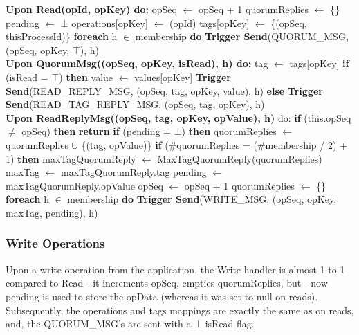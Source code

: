 \documentclass[sigconf]{acmart}
\begin{document}
\begin{algorithmic}[1]
\small

\State \textbf{Upon Read(opId, opKey) do:}
\State \quad opSeq $\gets$ opSeq + 1
\State \quad quorumReplies $\gets$ \{\}
\State \quad pending $\gets$ $\bot$
\State \quad operations[opKey] $\gets$ {(opId)}
\State \quad tags[opKey] $\gets$ \{(opSeq, thisProcessId)\}
\State \quad \textbf{foreach} h $\in$ membership \textbf{do}
\State \quad \quad \textbf{Trigger Send}(QUORUM\_MSG, (opSeq, opKey, $\top$), h) \\

\State \textbf{Upon QuorumMsg((opSeq, opKey, isRead), h) do:}
\State \quad tag $\gets$ tags[opKey]
\State \quad \textbf{if} (isRead = $\top$) \textbf{then}
\State \quad \quad value $\gets$ values[opKey]
\State \quad \quad \textbf{Trigger Send}(READ\_REPLY\_MSG, (opSeq, tag, opKey, value), h)
\State \quad \textbf{else}
\State \quad \quad \textbf{Trigger Send}(READ\_TAG\_REPLY\_MSG, (opSeq, tag, opKey), h) \\

\State \textbf{Upon ReadReplyMsg((opSeq, tag, opKey, opValue), h)} do:
\State \quad \textbf{if} (this.opSeq $\neq$ opSeq) \textbf{then}
\State \quad \quad \textbf{return}
\State \quad \textbf{if} (pending = $\bot$) \textbf{then}
\State \quad \quad quorumReplies $\gets$ quorumReplies $\cup$ \{(tag, opValue)\}
\State \quad \textbf{if} (\#quorumReplies = (\#membership / 2) + 1) \textbf{then}
\State \quad \quad maxTagQuorumReply $\gets$ MaxTagQuorumReply(quorumReplies)
\State \quad \quad maxTag $\gets$ maxTagQuorumReply.tag
\State \quad \quad pending $\gets$ maxTagQuorumReply.opValue
\State \quad \quad opSeq $\gets$ opSeq + 1
\State \quad \quad quorumReplies $\gets$ \{\} 
\State \quad \quad \textbf{foreach} h $\in$ membership \textbf{do}
\State \quad \quad \quad \textbf{Trigger Send}(WRITE\_MSG, (opSeq, opKey, maxTag, pending), h) \\

\end{algorithmic}

\subsubsection{Write Operations}

Upon a write operation from the application, the Write handler is almost 1-to-1 compared to Read - it increments opSeq, empties quorumReplies, but - now pending is used to store the opData (whereas it was set to null on reads). Subsequently, the operations and tags mappings are exactly the same as on reads, and, the QUORUM\_MSG's are sent with a $\bot$ isRead flag. \\
\end{document}
